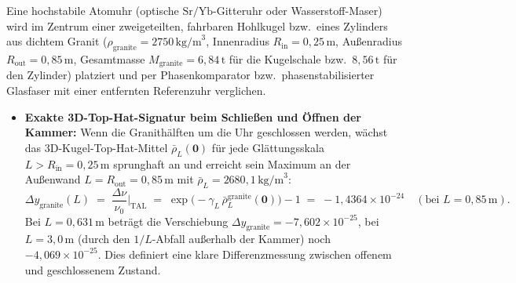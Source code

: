 \documentclass[10pt,a4paper]{article}
\begin{document}
\par
Eine hochstabile Atomuhr (optische $\text{Sr}/\text{Yb}$-Gitteruhr oder Wasserstoff-Maser) wird im Zentrum einer zweigeteilten, fahrbaren Hohlkugel bzw.\ eines Zylinders aus dichtem Granit ($\rho_{\text{granite}} = 2750\,\text{kg/m}^3$, Innenradius $R_{\text{in}} = 0{,}25\,\text{m}$, Au\ss enradius $R_{\text{out}} = 0{,}85\,\text{m}$, Gesamtmasse $M_{\text{granite}} = 6{,}84\,\text{t}$ f\"ur die Kugelschale bzw.\ $8{,}56\,\text{t}$ f\"ur den Zylinder) platziert und per Phasenkomparator bzw.\ phasenstabilisierter Glasfaser mit einer entfernten Referenzuhr verglichen.
\begin{itemize}\setlength{\itemsep}{1pt}\setlength{\parskip}{0pt}\setlength{\topsep}{1pt}
  \item \textbf{Exakte 3D-Top-Hat-Signatur beim Schlie\ss en und \"Offnen der Kammer:} Wenn die Granith\"alften um die Uhr geschlossen werden, w\"achst das 3D-Kugel-Top-Hat-Mittel $\bar{\rho}_L(\mathbf{0})$ f\"ur jede Gl\"attungsskala $L > R_{\text{in}} = 0{,}25\,\text{m}$ sprunghaft an und erreicht sein Maximum an der Au\ss enwand $L = R_{\text{out}} = 0{,}85\,\text{m}$ mit $\bar{\rho}_L = 2680{,}1\,\text{kg/m}^3$:
  \begin{equation}
    \Delta y_{\text{granite}}(L) \;=\; \frac{\Delta\nu}{\nu_0}\bigg|_{\text{TAL}} \;=\; \exp\!\bigl(-\gamma_L\,\bar{\rho}_L^{\text{granite}}(\mathbf{0})\bigr) - 1 \;=\; -1{,}4364\times 10^{-24}\quad(\text{bei }L = 0{,}85\,\text{m}).
  \end{equation}
  Bei $L = 0{,}631\,\text{m}$ betr\"agt die Verschiebung $\Delta y_{\text{granite}} = -7{,}602\times 10^{-25}$, bei $L = 3{,}0\,\text{m}$ (durch den $1/L$-Abfall au\ss erhalb der Kammer) noch $-4{,}069\times 10^{-25}$. Dies definiert eine klare Differenzmessung zwischen offenem und geschlossenem Zustand.
\end{itemize}
\end{document}
